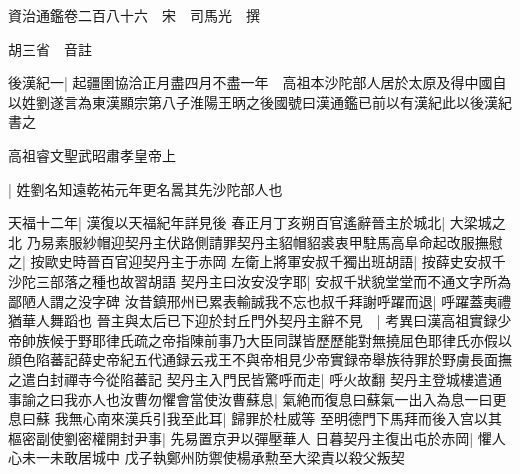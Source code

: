 資治通鑑卷二百八十六　宋　司馬光　撰

胡三省　音註

後漢紀一|{
	起疆圉協洽正月盡四月不盡一年　高祖本沙陀部人居於太原及得中國自以姓劉遂言為東漢顯宗第八子淮陽王昞之後國號曰漢通鑑已前以有漢紀此以後漢紀書之}


高祖睿文聖武昭肅孝皇帝上

|{
	姓劉名知遠乾祐元年更名暠其先沙陀部人也}


天福十二年|{
	漢復以天福紀年詳見後}
春正月丁亥朔百官遙辭晉主於城北|{
	大梁城之北}
乃易素服紗帽迎契丹主伏路側請罪契丹主貂帽貂裘衷甲駐馬高阜命起改服撫慰之|{
	按歐史時晉百官迎契丹主于赤岡}
左衛上將軍安叔千獨出班胡語|{
	按薛史安叔千沙陀三部落之種也故習胡語}
契丹主曰汝安没字耶|{
	安叔千狀貌堂堂而不通文字所為鄙陋人謂之没字碑}
汝昔鎮邢州已累表輸誠我不忘也叔千拜謝呼躍而退|{
	呼躍蓋夷禮猶華人舞蹈也}
晉主與太后已下迎於封丘門外契丹主辭不見　|{
	考異曰漢高祖實録少帝帥族候于野耶律氏疏之帝指陳前事乃大臣同謀皆歷歷能對無撓屈色耶律氏亦假以顔色陷蕃記薛史帝紀五代通録云戎王不與帝相見少帝實録帝舉族待罪於野虜長面撫之遣白封禪寺今從陷蕃記}
契丹主入門民皆驚呼而走|{
	呼火故翻}
契丹主登城樓遣通事諭之曰我亦人也汝曹勿懼會當使汝曹蘇息|{
	氣絶而復息曰蘇氣一出入為息一曰更息曰蘇}
我無心南來漢兵引我至此耳|{
	歸罪於杜威等}
至明德門下馬拜而後入宫以其樞密副使劉密權開封尹事|{
	先易置京尹以彈壓華人}
日暮契丹主復出屯於赤岡|{
	懼人心未一未敢居城中}
戊子執鄭州防禦使楊承勲至大梁責以殺父叛契

